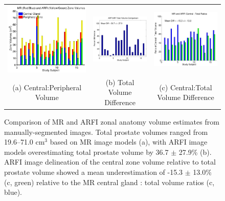 \begin{figure}[htb!]
\centering
\begin{tabular}{ccc}
\includegraphics[width=0.3\linewidth]{figs/mr_arfi_volumes.pdf} &
\includegraphics[width=0.3\linewidth]{figs/mr_arfi_volume_diff.pdf} &
\includegraphics[width=0.3\linewidth]{figs/mr_arfi_central_total_diff.pdf} \\
(a) Central:Peripheral Volume & (b) Total Volume Difference & (c) Central:Total Volume Difference\\
\end{tabular}
\caption{Comparison of MR and ARFI zonal anatomy volume estimates from manually-segmented images.  Total prostate volumes ranged from 19.6--71.0 cm$^3$ based on MR image models (a), with ARFI image models overestimating total prostate volume by 36.7 $\pm$ 27.9\% (b).  ARFI image delineation of the central zone volume relative to total prostate volume showed a mean underestimation of -15.3 $\pm$ 13.0\% (c, green) relative to the MR central gland : total volume ratios (c, blue).}
\label{fig:mr_arfi_volumes} 
\end{figure}
